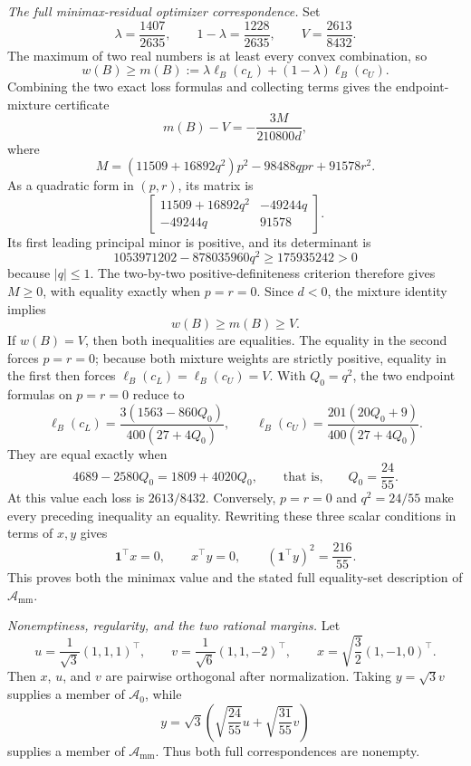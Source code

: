 \emph{The full minimax-residual optimizer correspondence.}
Set
\[
\lambda=\frac{1407}{2635},
\qquad
1-\lambda=\frac{1228}{2635},
\qquad
V=\frac{2613}{8432}.
\]
The maximum of two real numbers is at least every convex combination, so
\[
w(B)\ge
m(B):=\lambda\ell_B(c_L)+(1-\lambda)\ell_B(c_U).
\]
Combining the two exact loss formulas and collecting terms gives the endpoint-mixture certificate
\[
m(B)-V=-\frac{3M}{210800d},
\]
where
\[
M=(11509+16892q^2)p^2-98488qpr+91578r^2.
\]
As a quadratic form in \((p,r)\), its matrix is
\[
\begin{bmatrix}
11509+16892q^2&-49244q\\
-49244q&91578
\end{bmatrix}.
\]
Its first leading principal minor is positive, and its determinant is
\[
1053971202-878035960q^2
\ge175935242>0
\]
because \(|q|\le1\).  The two-by-two positive-definiteness criterion therefore gives \(M\ge0\), with equality exactly when \(p=r=0\).  Since \(d<0\), the mixture identity implies
\[
w(B)\ge m(B)\ge V.
\]
If \(w(B)=V\), then both inequalities are equalities.  The equality in the second forces \(p=r=0\); because both mixture weights are strictly positive, equality in the first then forces \(\ell_B(c_L)=\ell_B(c_U)=V\).  With \(Q_0=q^2\), the two endpoint formulas on \(p=r=0\) reduce to
\[
\ell_B(c_L)=\frac{3(1563-860Q_0)}{400(27+4Q_0)},
\qquad
\ell_B(c_U)=\frac{201(20Q_0+9)}{400(27+4Q_0)}.
\]
They are equal exactly when
\[
4689-2580Q_0=1809+4020Q_0,
\qquad\text{that is,}\qquad Q_0=\frac{24}{55}.
\]
At this value each loss is \(2613/8432\).  Conversely, \(p=r=0\) and \(q^2=24/55\) make every preceding inequality an equality.  Rewriting these three scalar conditions in terms of \(x,y\) gives
\[
\mathbf 1^{\top}x=0,
\qquad x^{\top}y=0,
\qquad(\mathbf 1^{\top}y)^2=\frac{216}{55}.
\]
This proves both the minimax value and the stated full equality-set description of \(\mathcal A_{\mathrm{mm}}\).

\emph{Nonemptiness, regularity, and the two rational margins.}
Let
\[
u=\frac1{\sqrt3}(1,1,1)^{\top},
\qquad
v=\frac1{\sqrt6}(1,1,-2)^{\top},
\qquad
x=\sqrt{\frac32}(1,-1,0)^{\top}.
\]
Then \(x\), \(u\), and \(v\) are pairwise orthogonal after normalization.  Taking \(y=\sqrt3v\) supplies a member of \(\mathcal A_0\), while
\[
y=\sqrt3\left(\sqrt{\frac{24}{55}}u+\sqrt{\frac{31}{55}}v\right)
\]
supplies a member of \(\mathcal A_{\mathrm{mm}}\).  Thus both full correspondences are nonempty.

